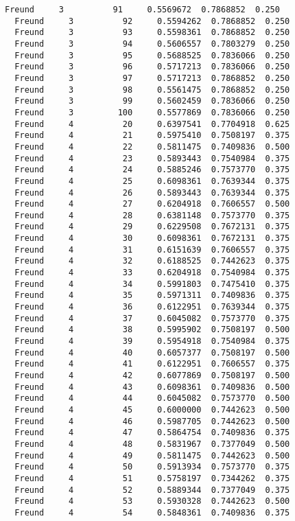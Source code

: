 \documentclass[11pt]{article}
\begin{document}
\begin{Verbatim}[commandchars=\\\{\}]
  Freund     3          91     0.5569672  0.7868852  0.250
  Freund     3          92     0.5594262  0.7868852  0.250
  Freund     3          93     0.5598361  0.7868852  0.250
  Freund     3          94     0.5606557  0.7803279  0.250
  Freund     3          95     0.5688525  0.7836066  0.250
  Freund     3          96     0.5717213  0.7836066  0.250
  Freund     3          97     0.5717213  0.7868852  0.250
  Freund     3          98     0.5561475  0.7868852  0.250
  Freund     3          99     0.5602459  0.7836066  0.250
  Freund     3         100     0.5577869  0.7836066  0.250
  Freund     4          20     0.6397541  0.7704918  0.625
  Freund     4          21     0.5975410  0.7508197  0.375
  Freund     4          22     0.5811475  0.7409836  0.500
  Freund     4          23     0.5893443  0.7540984  0.375
  Freund     4          24     0.5885246  0.7573770  0.375
  Freund     4          25     0.6098361  0.7639344  0.375
  Freund     4          26     0.5893443  0.7639344  0.375
  Freund     4          27     0.6204918  0.7606557  0.500
  Freund     4          28     0.6381148  0.7573770  0.375
  Freund     4          29     0.6229508  0.7672131  0.375
  Freund     4          30     0.6098361  0.7672131  0.375
  Freund     4          31     0.6151639  0.7606557  0.375
  Freund     4          32     0.6188525  0.7442623  0.375
  Freund     4          33     0.6204918  0.7540984  0.375
  Freund     4          34     0.5991803  0.7475410  0.375
  Freund     4          35     0.5971311  0.7409836  0.375
  Freund     4          36     0.6122951  0.7639344  0.375
  Freund     4          37     0.6045082  0.7573770  0.375
  Freund     4          38     0.5995902  0.7508197  0.500
  Freund     4          39     0.5954918  0.7540984  0.375
  Freund     4          40     0.6057377  0.7508197  0.500
  Freund     4          41     0.6122951  0.7606557  0.375
  Freund     4          42     0.6077869  0.7508197  0.500
  Freund     4          43     0.6098361  0.7409836  0.500
  Freund     4          44     0.6045082  0.7573770  0.500
  Freund     4          45     0.6000000  0.7442623  0.500
  Freund     4          46     0.5987705  0.7442623  0.500
  Freund     4          47     0.5864754  0.7409836  0.375
  Freund     4          48     0.5831967  0.7377049  0.500
  Freund     4          49     0.5811475  0.7442623  0.500
  Freund     4          50     0.5913934  0.7573770  0.375
  Freund     4          51     0.5758197  0.7344262  0.375
  Freund     4          52     0.5889344  0.7377049  0.375
  Freund     4          53     0.5930328  0.7442623  0.500
  Freund     4          54     0.5848361  0.7409836  0.375

\end{Verbatim}
\end{document}
